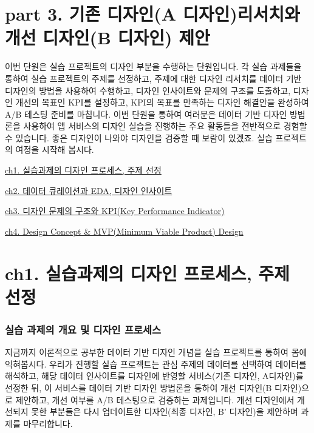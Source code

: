 \documentclass[
  letterpaper,
]{book}
\begin{document}
\chapter{part 3. 기존 디자인(A 디자인)리서치와 개선 디자인(B 디자인)
제안}\label{part-3.-uxae30uxc874-uxb514uxc790uxc778a-uxb514uxc790uxc778uxb9acuxc11cuxce58uxc640-uxac1cuxc120-uxb514uxc790uxc778b-uxb514uxc790uxc778-uxc81cuxc548}

이번 단원은 실습 프로젝트의 디자인 부분을 수행하는 단원입니다. 각 실습
과제들을 통하여 실습 프로젝트의 주제를 선정하고, 주제에 대한 디자인
리서치를 데이터 기반 디자인의 방법을 사용하여 수행하고, 디자인
인사이트와 문제의 구조를 도출하고, 디자인 개선의 목표인 KPI를 설정하고,
KPI의 목표를 만족하는 디자인 해결안을 완성하여 A/B 테스팅 준비를
마칩니다. 이번 단원을 통하여 여러분은 데이터 기반 디자인 방법론을
사용하여 앱 서비스의 디자인 실습을 진행하는 주요 활동들을 전반적으로
경험할 수 있습니다. 좋은 디자인이 나와야 디자인을 검증할 때 보람이
있겠죠. 실습 프로젝트의 여정을 시작해 봅시다.

\href{ch1.\%20실습과제의\%20디자인\%20프로세스,\%20주제\%20선정.qmd}{ch1.
실습과제의 디자인 프로세스, 주제 선정}

\href{ch2.\%20데이터\%20큐레이션과\%20EDA,\%20디자인\%20인사이트.qmd}{ch2.
데이터 큐레이션과 EDA, 디자인 인사이트}

\href{ch3.\%20디자인\%20문제의\%20구조와\%20KPI.qmd}{ch3. 디자인 문제의
구조와 KPI(Key Performance Indicator)}

\href{ch4.\%20Design\%20Concept\%20&\%20MVP(Minimum\%20Viable\%20Product)\%20Design.qmd}{ch4.
Design Concept \& MVP(Minimum Viable Product) Design}

\chapter{ch1. 실습과제의 디자인 프로세스, 주제
선정}\label{ch1.-uxc2e4uxc2b5uxacfcuxc81cuxc758-uxb514uxc790uxc778-uxd504uxb85cuxc138uxc2a4-uxc8fcuxc81c-uxc120uxc815}

\subsection{실습 과제의 개요 및 디자인
프로세스}\label{uxc2e4uxc2b5-uxacfcuxc81cuxc758-uxac1cuxc694-uxbc0f-uxb514uxc790uxc778-uxd504uxb85cuxc138uxc2a4}

지금까지 이론적으로 공부한 데이터 기반 디자인 개념을 실습 프로젝트를
통하여 몸에 익혀봅시다. 우리가 진행할 실습 프로젝트는 관심 주제의
데이터를 선택하여 데이터를 해석하고, 해당 데이터 인사이트를 디자인에
반영할 서비스(기존 디자인, A디자인)를 선정한 뒤, 이 서비스를 데이터 기반
디자인 방법론을 통하여 개선 디자인(B 디자인)으로 제안하고, 개선 여부를
A/B 테스팅으로 검증하는 과제입니다. 개선 디자인에서 개선되지 못한
부분들은 다시 업데이트한 디자인(최종 디자인, B' 디자인)을 제안하며
과제를 마무리합니다.
\end{document}
